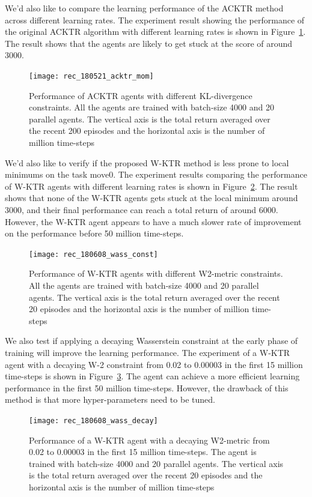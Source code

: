 We'd also like to compare the learning performance of the ACKTR method across different learning rates. The experiment result showing the performance of the original ACKTR algorithm with different learning rates is shown in Figure~\ref{fig_acktr_mom_tune}. The result shows that the agents are likely to get stuck at the score of around 3000. 
\begin{figure}[!htbp]
	\texttt{[image: rec\_180521\_acktr\_mom]}
	\centering
	\caption{Performance of ACKTR agents with different KL-divergence constraints. All the agents are trained with batch-size 4000 and 20 parallel agents. The vertical axis is the total return averaged over the recent 200 episodes and the horizontal axis is the number of million time-steps}\label{fig_acktr_mom_tune}
\end{figure}

We'd also like to verify if the proposed W-KTR method is less prone to local minimums on the task move0. The experiment results comparing the performance of W-KTR agents with different learning rates is shown in Figure~\ref{fig_wass_const_tune}. The result shows that none of the W-KTR agents gets stuck at the local minimum around 3000, and their final performance can reach a total return of around 6000. However, the W-KTR agent appears to have a much slower rate of improvement on the performance before 50 million time-steps.
\begin{figure}[!htbp]
	\texttt{[image: rec\_180608\_wass\_const]}
	\centering
	\caption{Performance of W-KTR agents with different W2-metric constraints. All the agents are trained with batch-size 4000 and 20 parallel agents. The vertical axis is the total return averaged over the recent 20 episodes and the horizontal axis is the number of million time-steps}\label{fig_wass_const_tune}
\end{figure}

We also test if applying a decaying Wasserstein constraint at the early phase of training will improve the learning performance. The experiment of a W-KTR agent with a decaying W-2 constraint from 0.02 to 0.00003 in the first 15 million time-steps is shown in Figure~\ref{fig_wass_decay}. The agent can achieve a more efficient learning performance in the first 50 million time-steps. However, the drawback of this method is that more hyper-parameters need to be tuned.
\begin{figure}[!htbp]
	\texttt{[image: rec\_180608\_wass\_decay]}
	\centering
	\caption{Performance of a W-KTR agent with a decaying W2-metric from 0.02 to 0.00003 in the first 15 million time-steps. The agent is trained with batch-size 4000 and 20 parallel agents. The vertical axis is the total return averaged over the recent 20 episodes and the horizontal axis is the number of million time-steps}\label{fig_wass_decay}
\end{figure}


